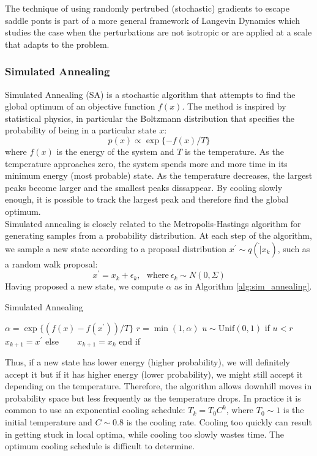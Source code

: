 The technique of using randomly pertrubed (stochastic) gradients to escape saddle ponts is part of a more general framework of Langevin Dynamics which studies the case when the perturbations are not isotropic or are applied at a scale that adapts to the problem. 

\subsubsection{Simulated Annealing}

Simulated Annealing (SA) is a stochastic algorithm that attempts to find the global optimum of an objective function $f(x)$. The method is inspired by statistical physics, in particular the Boltzmann distribution that specifies the probability of being in a particular state $x$:
\begin{equation}
    p(x) \propto \exp\{-f(x)/T\}
\end{equation}
where $f(x)$ is the energy of the system and $T$ is the temperature. As the temperature approaches zero, the system spends more and more time in its minimum energy (most probable) state. As the temperature decreases, the largest peaks become larger and the smallest peaks dissappear. By cooling slowly enough, it is possible to track the largest peak and therefore find the global optimum.\\

Simulated annealing is closely related to the Metropolis-Hastings algorithm for generating samples from a probability distribution. At each step of the algorithm, we sample a new state according to a proposal distribution $x^{\prime} \sim q(\dot|x_k)$, such as a random walk proposal:
\begin{equation}
    x^{\prime} = x_k + \epsilon_k, ~~~ \mathrm{where}~ \epsilon_k \sim N(0,\Sigma)
\end{equation}
Having proposed a new state, we compute $\alpha$ as in Algorithm \ref{alg:sim_annealing}.
\begin{algorithm}
\caption{Simulated Annealing}
\label{alg:sim_annealing}
\begin{algorithmic}[1]
\STATE $\alpha = \exp\{(f(x)-f(x^{\prime}))/T\}$
\STATE $r = \min(1,\alpha)$
\STATE $u \sim \mathrm{Unif}(0,1)$
\STATE if $u < r$ 
\STATE ~~~ $x_{k+1} = x^{\prime}$
\STATE else
\STATE ~~~ $x_{k+1} = x_k$
\STATE end if  
\end{algorithmic}
\end{algorithm}
Thus, if a new state has lower energy (higher probability), we will definitely accept it but if it has higher energy (lower probability), we might still accept it depending on the temperature. Therefore, the algorithm allows downhill moves in probability space but less frequently as the temperature drops. In practice it is common to use an exponential cooling schedule: $T_k = T_0 C^{k}$, where $T_0 \sim 1$ is the initial temperature and $C \sim 0.8$ is the cooling rate. Cooling too quickly can result in getting stuck in local optima, while cooling too slowly wastes time. The optimum cooling schedule is difficult to determine.    

